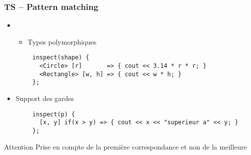 \documentclass[C++.tex]{subfiles}
\begin{document}
\begin{frame}[fragile]
	\frametitle{TS -- Pattern matching}
	\begin{itemize}
		\item[]
		\begin{itemize}
			\item Types polymorphiques
		\end{itemize}
	\end{itemize}

	\begin{verbatim}
		inspect(shape) {
		  <Circle> [r]       => { cout << 3.14 * r * r; }
		  <Rectangle> [w, h] => { cout << w * h; }
		};
	\end{verbatim}

	\begin{itemize}
		\item Support des gardes
	\end{itemize}

	\begin{verbatim}
		inspect(p) {
		  [x, y] if(x > y) => { cout << x << "superieur a" << y; }
		};
	\end{verbatim}

	\begin{alertblock}{Attention}
		Prise en compte de la première correspondance et non de la meilleure
	\end{alertblock}

\end{frame}
\end{document}
